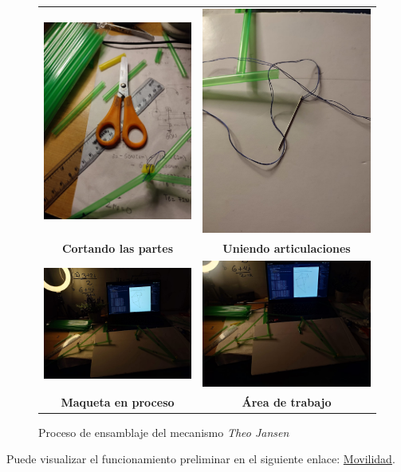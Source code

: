 \begin{figure}[H]
  \centering
  \begin{tabular}{cc}
    \includegraphics[width=0.2\linewidth]{./assets/mak1.jpeg} & 
    \includegraphics[width=0.2\linewidth]{./assets/mak2.jpeg} \\
    \textbf{Cortando las partes} & \textbf{Uniendo articulaciones} \\
    \includegraphics[width=0.2\linewidth]{./assets/mak3.jpeg} & 
    \includegraphics[width=0.2\linewidth]{./assets/mak4.jpeg} \\
    \textbf{Maqueta en proceso} & \textbf{Área de trabajo} \\
  \end{tabular}
  \caption{Proceso de ensamblaje del mecanismo \textit{Theo Jansen}}
  \label{fig:proceso}
\end{figure}

Puede visualizar el funcionamiento preliminar en el siguiente enlace: \href{https://youtu.be/ags0tXvnRCw}{Movilidad}.

\newpage

